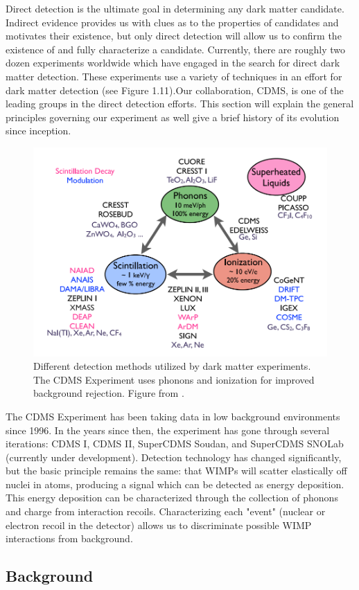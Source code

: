 \documentclass{report}
\begin{document}
Direct detection is the ultimate goal in determining any dark matter candidate. Indirect evidence provides us with clues as to the properties of candidates and motivates their existence, but only direct detection will allow us to confirm the existence of and fully characterize a candidate. Currently, there are roughly two dozen experiments worldwide which have engaged in the search for direct dark matter detection. These experiments use a variety of techniques in an effort for dark matter detection (see Figure 1.11).Our collaboration, CDMS, is one of the leading groups in the direct detection efforts. This section will explain the general principles governing our experiment as well give a brief history of its evolution since inception.

\begin{figure}[h]
\centering
\includegraphics[width = .5\textwidth]{Dm_experiments.png}
\caption{Different detection methods utilized by dark matter experiments. The CDMS Experiment uses phonons and ionization for improved background rejection. Figure from \cite{Figueroa2011}.}
\end{figure}

The CDMS Experiment has been taking data in low background environments since 1996. In the years since then, the experiment has gone through several iterations: CDMS I, CDMS II, SuperCDMS Soudan, and SuperCDMS SNOLab (currently under development). Detection technology has changed significantly, but the basic principle remains the same: that WIMPs will scatter elastically off nuclei in atoms, producing a signal which can be detected as energy deposition. This energy deposition can be characterized through the collection of phonons and charge from interaction recoils. Characterizing each "event" (nuclear or electron recoil in the detector) allows us to discriminate possible WIMP interactions from background.

\subsection{Background}
\end{document}
